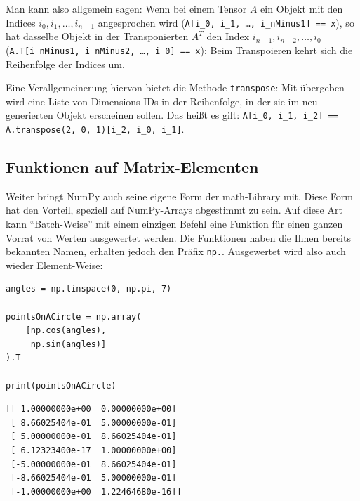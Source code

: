 Man kann also allgemein sagen: Wenn bei einem Tensor $A$ ein Objekt mit den Indices $i_0, i_1, \ldots, i_{n-1}$ angesprochen wird (\texttt{A[i\_0, i\_1, \ldots, i\_nMinus1] == x}), so hat dasselbe Objekt in der Transponierten $A^{T}$ den Index $i_{n-1}, i_{n-2}, \ldots, i_0$ (\texttt{A.T[i\_nMinus1, i\_nMinus2, \ldots, i\_0] == x}): Beim Transpoieren kehrt sich die Reihenfolge der Indices um.

Eine Verallgemeinerung hiervon bietet die Methode \texttt{transpose}: Mit übergeben wird eine Liste von Dimensions-IDs in der Reihenfolge, in der sie im neu generierten Objekt erscheinen sollen. Das heißt es gilt: \texttt{A[i\_0, i\_1, i\_2] == A.transpose(2, 0, 1)[i\_2, i\_0, i\_1]}.

\subsection{Funktionen auf Matrix-Elementen}
Weiter bringt NumPy auch seine eigene Form der math-Library mit. Diese Form hat den Vorteil, speziell auf NumPy-Arrays abgestimmt zu sein. Auf diese Art kann \enquote{Batch-Weise} mit einem einzigen Befehl eine Funktion für einen ganzen Vorrat von Werten ausgewertet werden. Die Funktionen haben die Ihnen bereits bekannten Namen, erhalten jedoch den Präfix \texttt{np.}. Ausgewertet wird also auch wieder Element-Weise:

\begin{tcbraster}[raster columns=2,
                  raster equal height,
                  nobeforeafter,
                  raster column skip=0.5cm]
\begin{codebox}
\begin{verbatim}
angles = np.linspace(0, np.pi, 7)

pointsOnACircle = np.array(
    [np.cos(angles),
     np.sin(angles)]
).T

print(pointsOnACircle)
\end{verbatim}
\end{codebox}
%
\begin{cmdbox}
\begin{verbatim}
[[ 1.00000000e+00  0.00000000e+00]
 [ 8.66025404e-01  5.00000000e-01]
 [ 5.00000000e-01  8.66025404e-01]
 [ 6.12323400e-17  1.00000000e+00]
 [-5.00000000e-01  8.66025404e-01]
 [-8.66025404e-01  5.00000000e-01]
 [-1.00000000e+00  1.22464680e-16]]
\end{verbatim}
\end{cmdbox}
\end{tcbraster}

